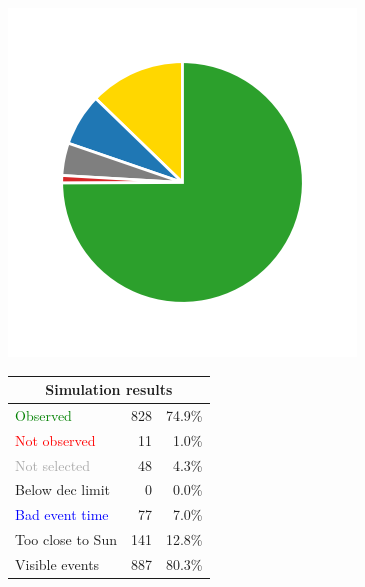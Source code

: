 \begin{colsection}
\begin{colsection}
\begin{figure}[p]
\begin{center}
\begin{minipage}[t]{0.2\textwidth}\vspace{10pt}
\includegraphics[width=\linewidth]{images/gw_sims/2n8+2k8_pie.png}
\end{minipage}
%
\begin{minipage}[t]{0.37\textwidth}\vspace{0pt}
\begin{tabular}{lrr}
\multicolumn{3}{c}{\textbf{Simulation results}} \\
\midrule
\textcolor{Green}{Observed} & 828 & 74.9\% \\
\textcolor{Red}{Not observed} & 11 & 1.0\% \\
\textcolor{darkgray}{Not selected} & 48 & 4.3\% \\
\textcolor{NavyBlue}{Below dec limit} & 0 & 0.0\% \\
\textcolor{Blue}{Bad event time} & 77 & 7.0\% \\
\textcolor{BurntOrange}{Too close to Sun} & 141 & 12.8\% \\
\midrule
Visible events & 887 &  80.3\% \\
\end{tabular}
\end{minipage}
%
\begin{minipage}[t]{0.35\textwidth}\vspace{0pt}

\end{minipage}
\end{center}
\end{figure}
\end{colsection}
\end{colsection}
